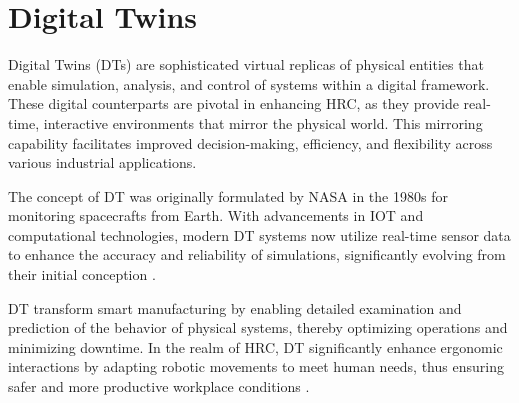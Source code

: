 



\section{Digital Twins}

Digital Twins (\ac{DTs}) are sophisticated virtual replicas of physical entities that enable simulation, analysis, and control of systems within a digital framework. 
These digital counterparts are pivotal in enhancing \ac{HRC}, as they provide real-time, interactive environments that mirror the physical world. 
This mirroring capability facilitates improved decision-making, efficiency, and flexibility across various industrial applications.

The concept of \ac{DT} was originally formulated by NASA in the 1980s for monitoring spacecrafts from Earth. With advancements in \ac{IOT} and 
computational technologies, modern \ac{DT} systems now utilize real-time sensor data to enhance the accuracy and reliability of simulations, 
significantly evolving from their initial conception \cite{liu2022digitaltwin}.

\ac{DT} transform smart manufacturing by enabling detailed examination and prediction of the behavior of physical systems, thereby optimizing operations 
and minimizing downtime. In the realm of \ac{HRC}, \ac{DT} significantly enhance ergonomic interactions by adapting robotic movements to meet human needs,
thus ensuring safer and more productive workplace conditions \cite{8477101}.

